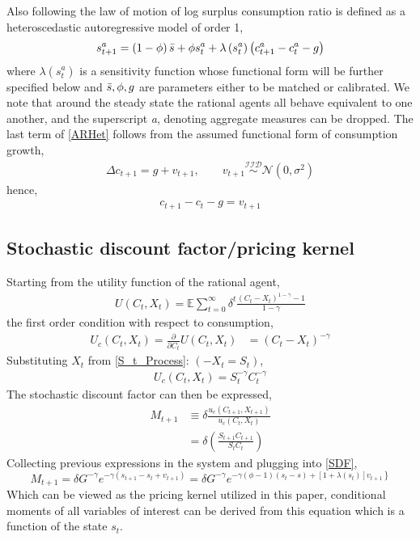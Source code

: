 Also following \citet{Campbell1999} the law of motion of log surplus consumption ratio is defined as a heteroscedastic autoregressive model of order 1,
\begin{align}
    s_{t+1}^a  = \left( 1-\phi  \right)\Bar{s}+ \phi s_t ^ a + \lambda \left( s_t ^a  \right)\left( c_{t+1}^a - c_t^a - g\right) \label{ARHet}
\end{align}
where $\lambda(s_t^a)$ is a sensitivity function whose functional form will be further specified below and $\Bar{s},\phi, g$ are parameters either to be matched or calibrated. We note that around the steady state the rational agents all behave equivalent to one another, and the superscript \textit{a}, denoting aggregate measures can be dropped.
The last term of \eqref{ARHet} follows from the assumed functional form of consumption growth,
\begin{align}
    \Delta c_{t+1} = g + v_{t+1}, \qquad v_{t+1}\overset{\mathcal{IID}}{\sim}\mathcal{N}\left(0, \sigma^2 \right) \label{DConos}
\end{align}
hence,
\begin{align}
     c_{t+1} - c_t - g = v_{t+1}
\end{align}
\subsection{Stochastic discount factor/pricing kernel}
Starting from the utility function of the rational agent,
\begin{align*}
    U(C_t, X_t) = \mathbb{E} \sum _ {t = 0} ^{\infty} \delta ^ t \frac{\left( C_t - X_t\right)^{1-\gamma } - 1}{1-\gamma }
\end{align*}
the first order condition with respect to consumption,
\begin{align*}
    U_c \left( C_t, X_t \right) = \frac{\partial}{\partial C_t} U(C_t, X_t) & = \left( C_t - X_t\right)^{-\gamma}
\end{align*}
Substituting $X_t$ from \eqref{S_t_Process}:  $(-X_t = S_t)$,
\begin{align}
     U_c \left( C_t, X_t \right) = S_t ^{-\gamma} C_t ^{-\gamma}
\end{align}
The stochastic discount factor can then be expressed,
\begin{align}
    M_{t+1} & \equiv  \delta \frac{u_c\left( C_{t+1}, X_{t+1} \right)}{u_c\left( C_{t}, X_{t} \right)} \nonumber \\
    & = \delta \left( \frac{S_{t+1} C_{t+1}}{S_t C_t} \right) \label{SDF}
\end{align}
Collecting previous expressions in the system and plugging into \eqref{SDF},
\begin{equation}
M_{t+1}=\delta G^{-\gamma} e^{-\gamma\left(s_{t+1}-s_{t}+v_{t+1}\right)}=\delta G^{-\gamma} e^{\left.-\gamma(\phi-1)\left(s_{t}-s\right)+\left[1+\lambda\left(s_{t}\right)\right] v_{t+1}\right\}}
\end{equation}
Which can be viewed as the pricing kernel utilized in this paper, conditional moments of all variables of interest can be derived from this equation which is a function of the state $s_t$.

